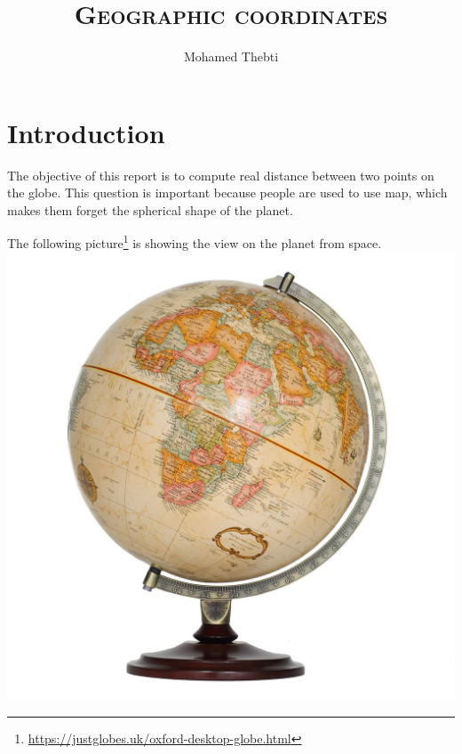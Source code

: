 \documentclass[12pt,a4paper]{article}
\title{
	\Huge\textsc{Geographic coordinates}
}
\author{Mohamed Thebti}
\begin{document}
\setlength{\parindent}{0mm}

\fancyhead[R]{\slshape \leftmark}

\fancyfoot[C]{}
\fancyfoot[R]{\thepage}

\maketitle
\newpage

\tableofcontents

\newpage



\section{Introduction}

The objective of this report is to compute real distance between two points on the globe. This question is important because people are used to use map, which makes them forget the spherical shape of the planet.

The following picture\footnote{\url{https://justglobes.uk/oxford-desktop-globe.html}} is showing the view on the planet from space. \\

\includegraphics[scale=.2]{oxford-2021-01.jpg}
\end{document}
